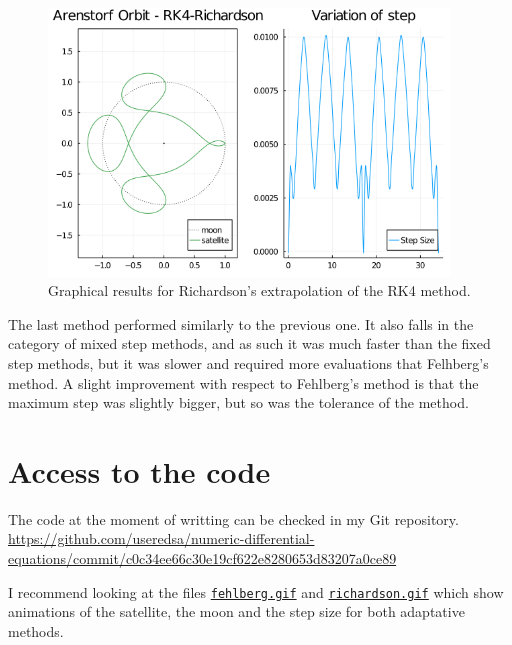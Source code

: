 \documentclass[12pt, onside]{article}
\begin{document}
\begin{figure}[H]
    \centering
    \includegraphics[width=0.95\textwidth]{media/arenstorf/richardson.png}
    \caption{Graphical results for Richardson's extrapolation of the RK4 method.}
\end{figure}

    The last method performed similarly to the previous one.
It also falls in the category of mixed step methods,
and as such it was much faster than the fixed step methods,
but it was slower and required more evaluations that Felhberg's method.
A slight improvement with respect to Fehlberg's method
is that the maximum step was slightly bigger, but so was the tolerance of the method.



\section{Access to the code}

    The code at the moment of writting can be checked in my Git repository.
{\small
\url{https://github.com/useredsa/numeric-differential-equations/commit/c0c34ee66c30e19cf622e8280653d83207a0ce89}
}

    I recommend looking at the files
\href{https://github.com/useredsa/numeric-differential-equations/blob/c0c34ee66c30e19cf622e8280653d83207a0ce89/media/arenstorf/fehlberg.gif}{\lstinline{fehlberg.gif}}
and
\href{https://github.com/useredsa/numeric-differential-equations/blob/c0c34ee66c30e19cf622e8280653d83207a0ce89/media/arenstorf/richardson.gif}{\lstinline!richardson.gif!}
which show animations of the satellite, the moon and the step size
for both adaptative methods.
\end{document}
